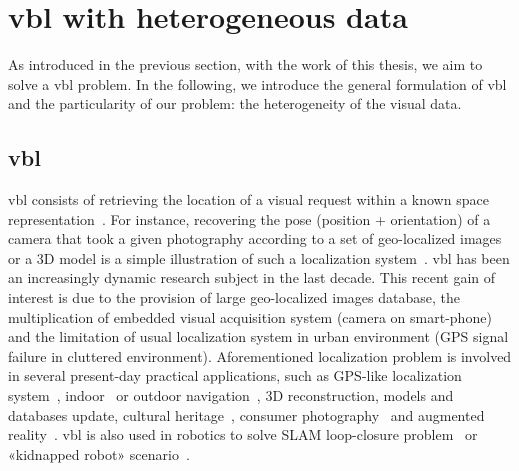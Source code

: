 \section{\Acl*{vbl} with heterogeneous data}

As introduced in the previous section, with the work of this thesis, we aim to solve a \ac{vbl} problem. In the following, we introduce the general formulation of \ac{vbl} and the particularity of our problem: the heterogeneity of the visual data.

\subsection{\Acl*{vbl}}
	\Ac{vbl} consists of retrieving the location of a visual request within a known space representation~\citep{Zamir2016, Piasco2017, Brejcha2017}. For instance, recovering the pose (position + orientation) of a camera that took a given photography according to a set of geo-localized images or a 3D model is a simple illustration of such a localization system~\citep{Kendall2015, Sattler2016a}. \ac{vbl} has been an increasingly dynamic research subject in the last decade. This recent gain of interest is due to the provision of large geo-localized images database, the multiplication of embedded visual acquisition system (\eg camera on smart-phone) and the limitation of usual localization system in urban environment (\eg GPS signal failure in cluttered environment). Aforementioned localization problem is involved in several present-day practical applications, such as GPS-like localization system~\citep{Armagan2017b}, indoor~\citep{Cavallari2018} or outdoor navigation~\citep{Brahmbhatt2017}, 3D reconstruction, models and databases update, cultural heritage~\citep{Bhowmik2017}, consumer photography~\citep{Hays2008, Weyand2016} and augmented reality~\citep{Glocker2013}. \Ac{vbl} is also used in robotics to solve SLAM loop-closure problem~\citep{Garg2018a} or «kidnapped robot» scenario~\citep{Cupec}.
	
